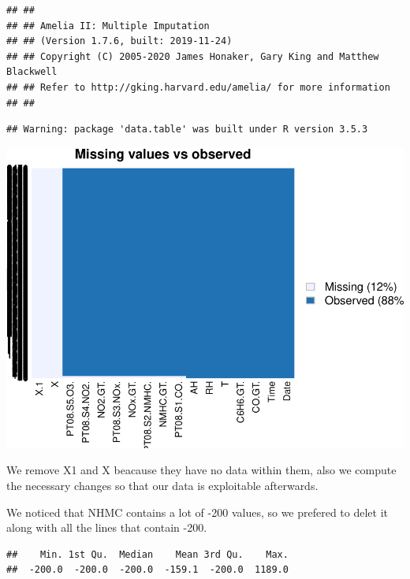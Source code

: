 \documentclass[]{article}
\newenvironment{Shaded}{\begin{snugshade}}{\end{snugshade}}
\newcommand{\KeywordTok}[1]{\textcolor[rgb]{0.13,0.29,0.53}{\textbf{#1}}}
\newcommand{\OperatorTok}[1]{\textcolor[rgb]{0.81,0.36,0.00}{\textbf{#1}}}
\newcommand{\NormalTok}[1]{#1}
\begin{document}
\begin{verbatim}
## ## 
## ## Amelia II: Multiple Imputation
## ## (Version 1.7.6, built: 2019-11-24)
## ## Copyright (C) 2005-2020 James Honaker, Gary King and Matthew Blackwell
## ## Refer to http://gking.harvard.edu/amelia/ for more information
## ##
\end{verbatim}

\begin{verbatim}
## Warning: package 'data.table' was built under R version 3.5.3
\end{verbatim}

\includegraphics{rapport_files/figure-latex/unnamed-chunk-3-1.pdf}

We remove X1 and X beacause they have no data within them, also we
compute the necessary changes so that our data is exploitable
afterwards.

We noticed that NHMC contains a lot of -200 values, so we prefered to
delet it along with all the lines that contain -200.

\begin{Shaded}
\end{Shaded}

\begin{verbatim}
##    Min. 1st Qu.  Median    Mean 3rd Qu.    Max. 
##  -200.0  -200.0  -200.0  -159.1  -200.0  1189.0
\end{verbatim}
\end{document}
